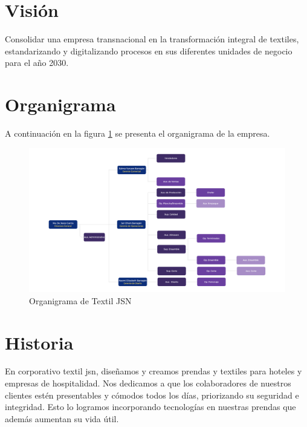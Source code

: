 \documentclass[12pt,letterpaper,spanish]{report}
\begin{document}
\section{Visión}
Consolidar una empresa transnacional en la transformación integral de textiles, estandarizando y digitalizando procesos en sus diferentes unidades de negocio para el año 2030.

\section{Organigrama}
A continuación en la figura \ref{a2} se presenta el organigrama de la empresa.

\begin{figure}[htp]
  \centering
  \includegraphics[width=\linewidth]{Organigrama_Jasana3.png}
  \caption{Organigrama de Textil JSN}\label{a2}
\end{figure}

\section{Historia}
En corporativo textil jsn, diseñamos y creamos prendas y textiles para hoteles y empresas de hospitalidad.
Nos dedicamos a que los colaboradores de nuestros clientes estén presentables y cómodos todos los días, priorizando su seguridad e integridad.
Esto lo logramos incorporando tecnologías en nuestras prendas que además aumentan su vida útil.


\newpage

\end{document}
